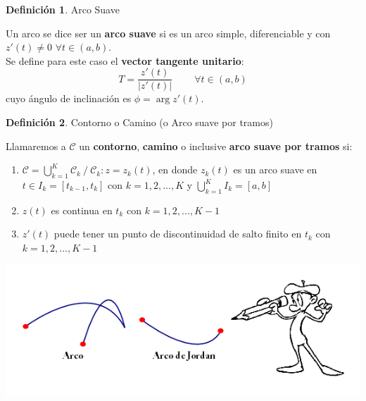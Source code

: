 \documentclass[12pt]{article}
\theoremstyle{definition}
\newtheorem{definition}{Definici\'on}[section]
\theoremstyle{theorem}
\theoremstyle{corolary}
\begin{document}
\colorbox{orange!40!white!80}{\parbox{\linewidth}{
\theoremstyle{definition}
\begin{definition}{Arco Suave}

Un arco se dice ser un \textbf{arco suave} si es un arco simple, diferenciable y con $z'(t)\neq 0$ $\forall t \in (a, b)$.\\

Se define para este caso el \textbf{vector tangente unitario}: $$T = \frac{z'(t)}{|z'(t)|}\ \qquad \forall t \in (a,b)$$ cuyo \'angulo de inclinaci\'on es $\phi = \arg z'(t)$.
\end{definition}}}
\linebreak
\linebreak

\colorbox{orange!40!white!80}{\parbox{\linewidth}{
\theoremstyle{definition}
\begin{definition}{Contorno o Camino (o Arco suave por tramos)}

Llamaremos a $\mathcal{C}$ un \textbf{contorno}, \textbf{camino} o inclusive \textbf{arco suave por tramos} si:
\begin{enumerate}
	\item $\mathcal{C} = \bigcup\limits_{k=1}^K \mathcal{C}_k\ /\ \mathcal{C}_k:z = z_k(t)$, en donde $z_k(t)$ es un arco suave en $t\in I_k = [t_{k-1}, t_k]$ con $k=1, 2, ..., K$ y $\bigcup\limits_{k=1}^K I_k = [a, b]$ 
	\item $z(t)$ es continua en $t_k$ con $k=1, 2,..., K-1$
	\item $z'(t)$ puede tener un punto de discontinuidad de salto finito en $t_k$ con $k=1, 2,..., K-1$
\end{enumerate}
\end{definition}}}
\linebreak
\linebreak

\begin{center}
	\includegraphics[scale=1]{curva2.png}
\end{center}
\end{document}
